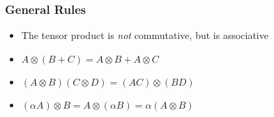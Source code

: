 \documentclass[class=article, crop=false]{standalone}
\begin{document}
  \subsubsection{General Rules}
  \begin{itemize}
    \item The tensor product is \emph{not} commutative, but is associative
    \item $A\otimes (B + C) = A\otimes B + A\otimes C$
    \item $(A\otimes B)(C\otimes D) = (AC)\otimes (BD)$
    \item $(\alpha A)\otimes B = A\otimes (\alpha B) = \alpha(A\otimes B)$
  \end{itemize}
\end{document}
